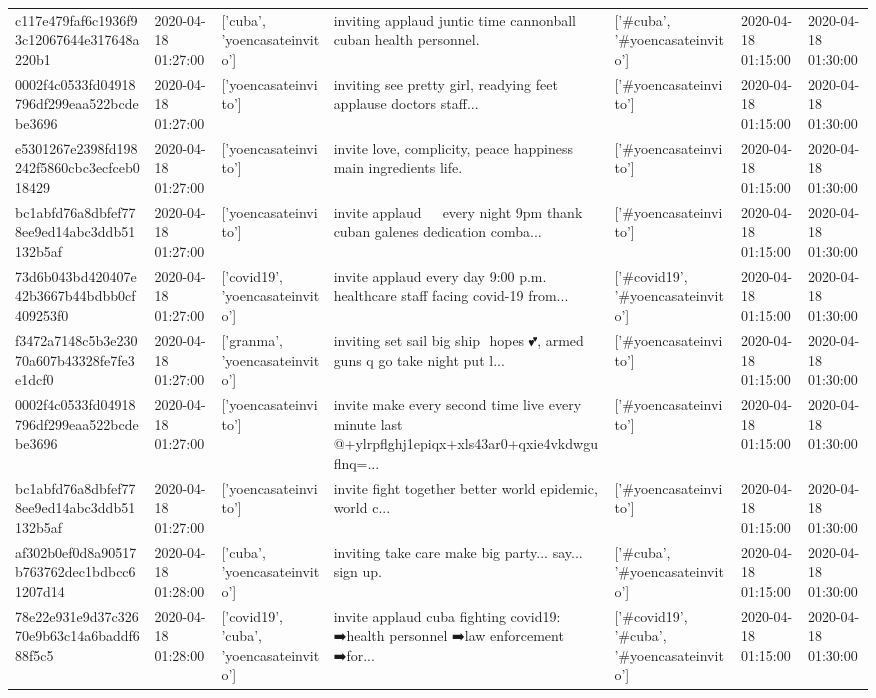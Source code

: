 \begin{tabular}{lllllll}
c117e479faf6c1936f93c12067644e317648a220b1 & 2020-04-18 01:27:00 & ['cuba', 'yoencasateinvito'] & inviting applaud juntic time cannonball cuban health personnel. & ['#cuba', '#yoencasateinvito'] & 2020-04-18 01:15:00 & 2020-04-18 01:30:00 \\
0002f4c0533fd04918796df299eaa522bcdebe3696 & 2020-04-18 01:27:00 & ['yoencasateinvito'] & inviting see pretty girl, readying feet applause doctors staff... & ['#yoencasateinvito'] & 2020-04-18 01:15:00 & 2020-04-18 01:30:00 \\
e5301267e2398fd198242f5860cbc3ecfceb018429 & 2020-04-18 01:27:00 & ['yoencasateinvito'] & invite love, complicity, peace happiness main ingredients life. & ['#yoencasateinvito'] & 2020-04-18 01:15:00 & 2020-04-18 01:30:00 \\
bc1abfd76a8dbfef778ee9ed14abc3ddb51132b5af & 2020-04-18 01:27:00 & ['yoencasateinvito'] & invite applaud 👏👏👏 every night 9pm thank cuban galenes dedication comba... & ['#yoencasateinvito'] & 2020-04-18 01:15:00 & 2020-04-18 01:30:00 \\
73d6b043bd420407e42b3667b44bdbb0cf409253f0 & 2020-04-18 01:27:00 & ['covid19', 'yoencasateinvito'] & invite applaud every day 9:00 p.m. healthcare staff facing covid-19 from... & ['#covid19', '#yoencasateinvito'] & 2020-04-18 01:15:00 & 2020-04-18 01:30:00 \\
f3472a7148c5b3e23070a607b43328fe7fe3e1dcf0 & 2020-04-18 01:27:00 & ['granma', 'yoencasateinvito'] & inviting set sail big ship ️ hopes 💕, armed guns q go take night put l... & ['#yoencasateinvito'] & 2020-04-18 01:15:00 & 2020-04-18 01:30:00 \\
0002f4c0533fd04918796df299eaa522bcdebe3696 & 2020-04-18 01:27:00 & ['yoencasateinvito'] & invite make every second time live every minute last @+ylrpflghj1epiqx+xls43ar0+qxie4vkdwguflnq=... & ['#yoencasateinvito'] & 2020-04-18 01:15:00 & 2020-04-18 01:30:00 \\
bc1abfd76a8dbfef778ee9ed14abc3ddb51132b5af & 2020-04-18 01:27:00 & ['yoencasateinvito'] & invite fight together better world epidemic, world c... & ['#yoencasateinvito'] & 2020-04-18 01:15:00 & 2020-04-18 01:30:00 \\
af302b0ef0d8a90517b763762dec1bdbcc61207d14 & 2020-04-18 01:28:00 & ['cuba', 'yoencasateinvito'] & inviting take care make big party... say... sign up. & ['#cuba', '#yoencasateinvito'] & 2020-04-18 01:15:00 & 2020-04-18 01:30:00 \\
78e22e931e9d37c32670e9b63c14a6baddf688f5c5 & 2020-04-18 01:28:00 & ['covid19', 'cuba', 'yoencasateinvito'] & invite applaud cuba fighting covid19: ➡️health personnel ➡️law enforcement ➡️for... & ['#covid19', '#cuba', '#yoencasateinvito'] & 2020-04-18 01:15:00 & 2020-04-18 01:30:00 \\

\end{tabular}

